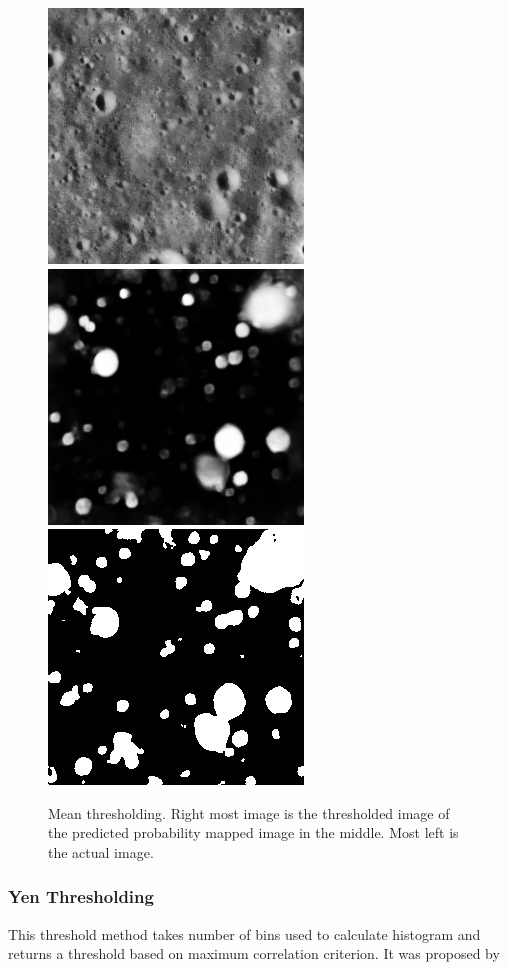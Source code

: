 \documentclass[11pt]{article}
\begin{document}
\begin{figure}[ht!]
	\includegraphics[width=.3\textwidth]{files/results/26.png}\hfill
	\includegraphics[width=.3\textwidth]{files/results/26_predict.png}\hfill
	\includegraphics[width=.3\textwidth]{files/results/mean.png}
	\caption{Mean thresholding. Right most image is the thresholded image of the predicted probability mapped image in the middle. Most left is the actual image.}
	\label{mean_th}
\end{figure}

\subsubsection{Yen Thresholding}
This threshold method takes number of bins used to calculate histogram and returns a threshold based on maximum correlation criterion. It was proposed by \cite{yen1995new}
\end{document}
